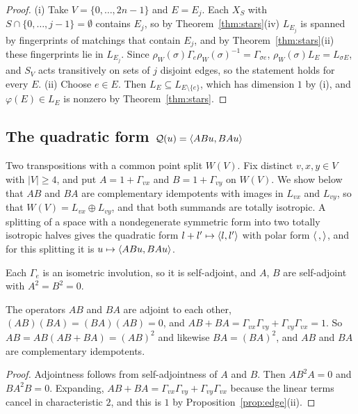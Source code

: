 \begin{proof}
(i) Take $V=\{0,\dots,2n-1\}$ and $E=E_j$. Each $X_S$ with $S\cap\{0,\dots,j-1\}=\emptyset$ contains $E_j$, so by Theorem~\ref{thm:stars}(iv) $L_{E_j}$ is spanned by fingerprints of matchings that contain $E_j$, and by Theorem~\ref{thm:stars}(ii) these fingerprints lie in $L_{E_j}$. Since $\rho_W(\sigma)\Gamma_e{\rho_W(\sigma)}^{-1}=\Gamma_{\sigma e}$, $\rho_W(\sigma)L_E=L_{\sigma E}$, and $S_V$ acts transitively on sets of $j$ disjoint edges, so the statement holds for every $E$. (ii) Choose $e\in E$. Then $L_E\subseteq L_{E\setminus\{e\}}$, which has dimension $1$ by (i), and $\varphi(E)\in L_E$ is nonzero by Theorem~\ref{thm:stars}.
\end{proof}

\subsection{The quadratic form \texorpdfstring{$\mathcal{Q}(u)=\langle ABu,BAu\rangle$}{Q(u)=<ABu,BAu>}}\label{subsec:quad}

Two transpositions with a common point split $W(V)$. Fix distinct $v,x,y\in V$ with $|V|\ge4$, and put $A=1+\Gamma_{vx}$ and $B=1+\Gamma_{vy}$ on $W(V)$. We show below that $AB$ and $BA$ are complementary idempotents with images in $L_{vx}$ and $L_{vy}$, so that $W(V)=L_{vx}\oplus L_{vy}$, and that both summands are totally isotropic. A splitting of a space with a nondegenerate symmetric form into two totally isotropic halves gives the quadratic form $l+l'\mapsto\langle l,l'\rangle$ with polar form $\langle\,,\rangle$, and for this splitting it is $u\mapsto\langle ABu,BAu\rangle$.

Each $\Gamma_e$ is an isometric involution, so it is self-adjoint, and $A$, $B$ are self-adjoint with $A^2=B^2=0$.

\begin{lemma}\label{lem:TS}
The operators $AB$ and $BA$ are adjoint to each other, $(AB)(BA)=(BA)(AB)=0$, and $AB+BA=\Gamma_{vx}\Gamma_{vy}+\Gamma_{vy}\Gamma_{vx}=1$. So $AB=AB(AB+BA)={(AB)}^2$ and likewise $BA={(BA)}^2$, and $AB$ and $BA$ are complementary idempotents.
\end{lemma}

\begin{proof}
Adjointness follows from self-adjointness of $A$ and $B$. Then $AB^{2}A=0$ and $BA^{2}B=0$. Expanding, $AB+BA=\Gamma_{vx}\Gamma_{vy}+\Gamma_{vy}\Gamma_{vx}$ because the linear terms cancel in characteristic $2$, and this is $1$ by Proposition~\ref{prop:edge}(ii).
\end{proof}

